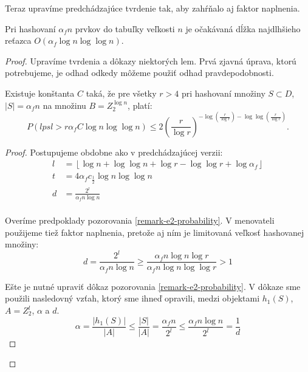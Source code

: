 Teraz upravíme predchádzajúce tvrdenie tak, aby zahŕňalo aj faktor naplnenia. 
\begin{theorem}
\label{theorem-n-to-n}
Pri hashovaní $\alpha_f n$ prvkov do tabuľky veľkosti $n$ je očakávaná dĺžka najdlhšieho reťazca $O(\alpha_f \log n \log \log n)$.
\end{theorem}
\begin{proof}
Upravíme tvrdenia a dôkazy niektorých lem. Prvá zjavná úprava, ktorú potrebujeme, je odhad odkedy môžeme použiť odhad pravdepodobnosti.

\begin{remark}
Existuje konštanta $C$ taká, že pre všetky $r > 4$ pri hashovaní množiny $S \subset D$, $|S| = \alpha_f n$ na množinu $B = Z_2^{\log n}$, platí:
\begin{displaymath}
P(lpsl > r \alpha_f C \log n \log \log n) \leq 2 \left(\frac{r}{\log r}\right)^{-\log \left(\frac{r}{\log r}\right) - \log \log \left(\frac{r}{\log r}\right)}\textit{.}
\end{displaymath}
\end{remark}
\begin{proof}
Postupujeme obdobne ako v predchádzajúcej verzii:
\begin{displaymath}
\begin{split}
l & = \left\lfloor \log n + \log \log n + \log r - \log \log r + \log \alpha_f \right\rfloor \\
t & = 4\alpha_f c_{\frac{1}{2}} \log n \log \log n \\
d & = \frac{2^l}{\alpha_f n \log n} \\
\end{split}
\end{displaymath}

Overíme predpoklady pozorovania \ref{remark-e2-probability}. V menovateli použijeme tiež faktor naplnenia, pretože aj ním je limitovaná veľkosť hashovanej množiny:
\begin{displaymath}
d = \frac{2^l}{\alpha_f n \log n} \geq \frac{\alpha_f n \log n \log r}{\alpha_f n \log n \log \log r} > 1
\end{displaymath}

Ešte je nutné upraviť dôkaz pozorovania \ref{remark-e2-probability}. V dôkaze sme použili nasledovný vzťah, ktorý sme ihneď opravili, medzi objektami $h_1(S)$, $A = Z_2^l$, $\alpha$ a $d$.
\begin{displaymath}
\alpha = \frac{|h_1(S)|}{|A|}\leq \frac{|S|}{|A|} = \frac{\alpha_f n}{2^l} \leq \frac{\alpha_f n \log n}{2^l} = \frac{1}{d}
\end{displaymath}


\end{proof}
\end{proof}
